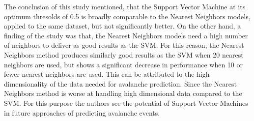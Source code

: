 \documentclass[../masterarbeit.tex]{subfiles}
\begin{document}
The conclusion of this study mentioned, that the Support Vector Machine at its optimum thresolds of 0.5 is broadly comparable to the Nearest Neighbors models, applied to the same dataset, but not significantly better. On the other hand, a finding of the study was that, the Nearest Neighbors models need a high number of neighbors to deliver as good results as the SVM. For this reason, the Nearest Neighbors method produces similarly good results as the SVM when 20 nearest neighbors are used, but shows a significant decrease in performance when 10 or fewer nearest neighbors are used. This can be attributed to the high dimensionality of the data needed for avalanche prediction. Since the Nearest Neighbors method is worse at handling high dimensional data compared to the SVM. For this purpose the authors see the potential of Support Vector Machines in future approaches of predicting avalanche events. \autocite[]{Pozdnoukhov:2008} \\~\\
\end{document}
